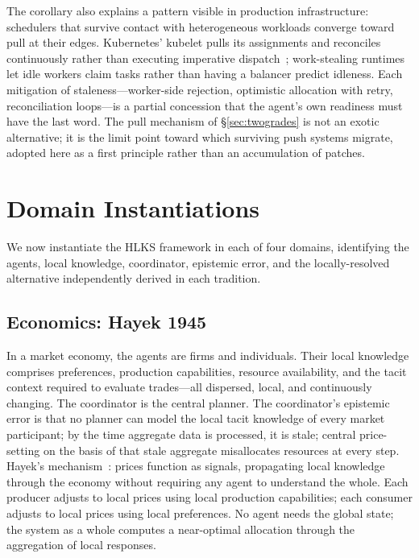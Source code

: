 \documentclass[11pt]{article}
\theoremstyle{definition}
\theoremstyle{plain}
\theoremstyle{plain}
\begin{document}
The corollary also explains a pattern visible in production infrastructure:
schedulers that survive contact with heterogeneous workloads converge
toward pull at their edges. Kubernetes' kubelet pulls its assignments and
reconciles continuously rather than executing imperative
dispatch~\cite{burns2016}; work-stealing runtimes let idle workers claim
tasks rather than having a balancer predict idleness. Each mitigation of
staleness---worker-side rejection, optimistic allocation with retry,
reconciliation loops---is a partial concession that the agent's own
readiness must have the last word. The pull mechanism of
\S\ref{sec:twogrades} is not an exotic alternative; it is the limit point
toward which surviving push systems migrate, adopted here as a first
principle rather than an accumulation of patches.

\section{Domain Instantiations}
\label{sec:domains}

We now instantiate the HLKS framework in each of four domains, identifying
the agents, local knowledge, coordinator, epistemic error, and the
locally-resolved alternative independently derived in each tradition.

\subsection{Economics: Hayek 1945}

In a market economy, the agents are firms and individuals. Their local
knowledge comprises preferences, production capabilities, resource
availability, and the tacit context required to evaluate trades---all
dispersed, local, and continuously changing. The coordinator is the central
planner. The coordinator's epistemic error is that no planner can model the
local tacit knowledge of every market participant; by the time aggregate data
is processed, it is stale; central price-setting on the basis of that stale
aggregate misallocates resources at every step. Hayek's
mechanism~\cite{hayek1945}: prices function as signals, propagating local
knowledge through the economy without requiring any agent to understand the
whole. Each producer adjusts to local prices using local production
capabilities; each consumer adjusts to local prices using local preferences.
No agent needs the global state; the system as a whole computes a
near-optimal allocation through the aggregation of local responses.
\end{document}
